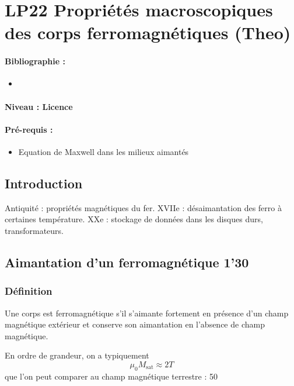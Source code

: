 \section{LP22 Propriétés macroscopiques des corps ferromagnétiques (Theo)}

\paragraph{Bibliographie :}
\begin{itemize}
\item 
\end{itemize}

\paragraph{Niveau : Licence} 

\paragraph{Pré-requis :}
\begin{itemize}
\item Equation de Maxwell dans les milieux aimantés
\end{itemize}

\subsection{Introduction}

Antiquité : propriétés magnétiques du fer.
XVIIe : désaimantation des ferro à certaines température.
XXe : stockage de données dans les disques durs, transformateurs.

\subsection{Aimantation d'un ferromagnétique 1'30}

\subsubsection{Définition}

Une corps est ferromagnétique  s'il s'aimante fortement en présence d'un champ magnétique extérieur et conserve son aimantation en l'absence de champ magnétique.

En ordre de grandeur, on a typiquement 
\begin{equation}
\mu_0 M_\mathrm{sat} \approx \unit{2}{T}
\end{equation}
que l'on peut comparer au champ magnétique terrestre : \unit{50}{\micro\tesla}

